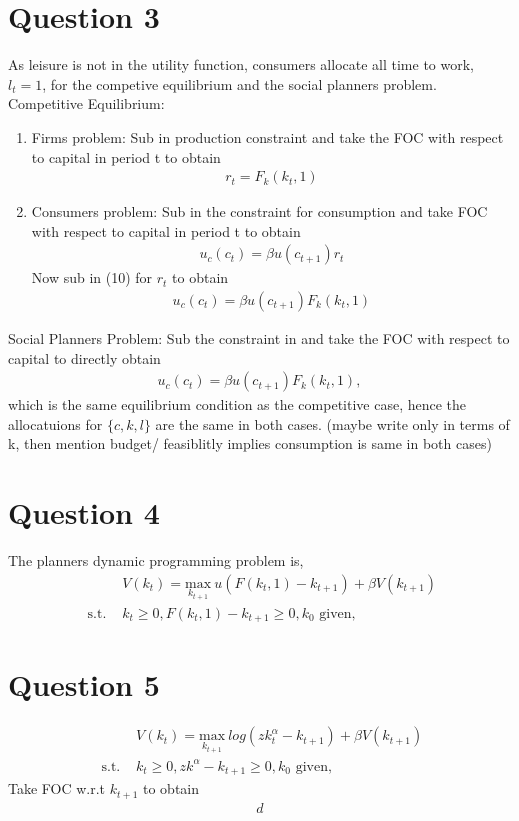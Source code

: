 \documentclass{article}
\begin{document}
\section*{Question 3}
As leisure is not in the utility function, consumers allocate all time to work, $l_{t} = 1$, for the competive equilibrium and the social planners problem. \\
$~$\\
Competitive Equilibrium:
\begin{enumerate}
\item Firms problem: Sub in production constraint and take the FOC with respect to capital in period t to obtain
\begin{align}
r_{t} =  F_{k}(k_{t},1)
\end{align}
\item Consumers problem: Sub in the constraint for consumption and take FOC with respect to capital in period t to obtain
\begin{align}
u_{c}(c_{t}) = \beta u(c_{t+1})r_{t}
\end{align}
Now sub in (10) for $r_{t}$ to obtain
\begin{align}
u_{c}(c_{t}) = \beta u(c_{t+1}) F_{k}(k_{t},1)
\end{align}
\end{enumerate}
Social Planners Problem:  Sub the constraint in and take the FOC with respect to capital to directly obtain
\begin{align}
u_{c}(c_{t}) = \beta u(c_{t+1}) F_{k}(k_{t},1),
\end{align}
which is the same equilibrium condition as the competitive case, hence the allocatuions for $\{c, k, l\}$ are the same in both cases. (maybe write only in terms of k, then mention budget/ feasiblitly implies consumption is same in both cases)

\section{Question 4}
The planners dynamic programming problem is, 
\begin{align}
&V(k_{t}) = \underset{ k_{t+1}}{\text{max}} ~u(F(k_{t}, 1) - k_{t+1}) + \beta V(k_{t+1})\\
\text{ s.t. } &k_{t} \geq 0, F(k_{t}, 1) - k_{t+1} \geq 0,  k_{0} \text{ given},  
\end{align}

\section{Question 5}
\begin{align}
&V(k_{t}) = \underset{ k_{t+1}}{\text{max}}~ log(zk_{t}^{\alpha} - k_{t+1}) + \beta V(k_{t+1})\\
\text{ s.t. } &k_{t} \geq 0, zk^{\alpha}  - k_{t+1} \geq 0,  k_{0} \text{ given},  
\end{align}
Take FOC w.r.t $k_{t+1}$ to obtain
\begin{align}
d
\end{align}
\end{document}
